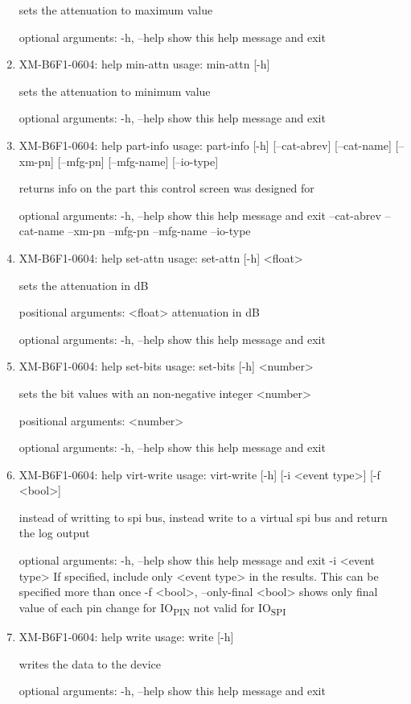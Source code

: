 \documentclass[11pt]{article}
\begin{document}
\begin{enumerate}
sets the attenuation to maximum value

optional arguments:
  -h, --help  show this help message and exit

\item XM-B6F1-0604: help min-attn
\label{sec:org8ab4acd}
usage: min-attn [-h]

sets the attenuation to minimum value

optional arguments:
  -h, --help  show this help message and exit

\item XM-B6F1-0604: help part-info
\label{sec:org223d581}
usage: part-info  [-h] [--cat-abrev] [--cat-name] [--xm-pn] [--mfg-pn] [--mfg-name]
        [--io-type]

returns info on the part this control screen was designed for

optional arguments:
  -h, --help   show this help message and exit
  --cat-abrev
  --cat-name
  --xm-pn
  --mfg-pn
  --mfg-name
  --io-type

\item XM-B6F1-0604: help set-attn
\label{sec:org26d3660}
usage: set-attn [-h] <float>

sets the attenuation in dB

positional arguments:
  <float>     attenuation in dB

optional arguments:
  -h, --help  show this help message and exit

\item XM-B6F1-0604: help set-bits
\label{sec:org381d4fe}
usage: set-bits [-h] <number>

sets the bit values with an non-negative integer <number>

positional arguments:
  <number>

optional arguments:
  -h, --help  show this help message and exit

\item XM-B6F1-0604: help virt-write
\label{sec:org813b7cc}
usage: virt-write [-h] [-i <event type>] [-f <bool>]

instead of writting to spi bus, instead write to a virtual spi bus and return
the log output

optional arguments:
  -h, --help            show this help message and exit
  -i <event type>       If specified, include only <event type> in the
                        results. This can be specified more than once
  -f <bool>, --only-final <bool>
                        shows only final value of each pin change for IO\textsubscript{PIN}
                        not valid for IO\textsubscript{SPI}

\item XM-B6F1-0604: help write
\label{sec:org55bd12f}
usage: write [-h]

writes the data to the device

optional arguments:
  -h, --help  show this help message and exit
\end{enumerate}
\end{document}
